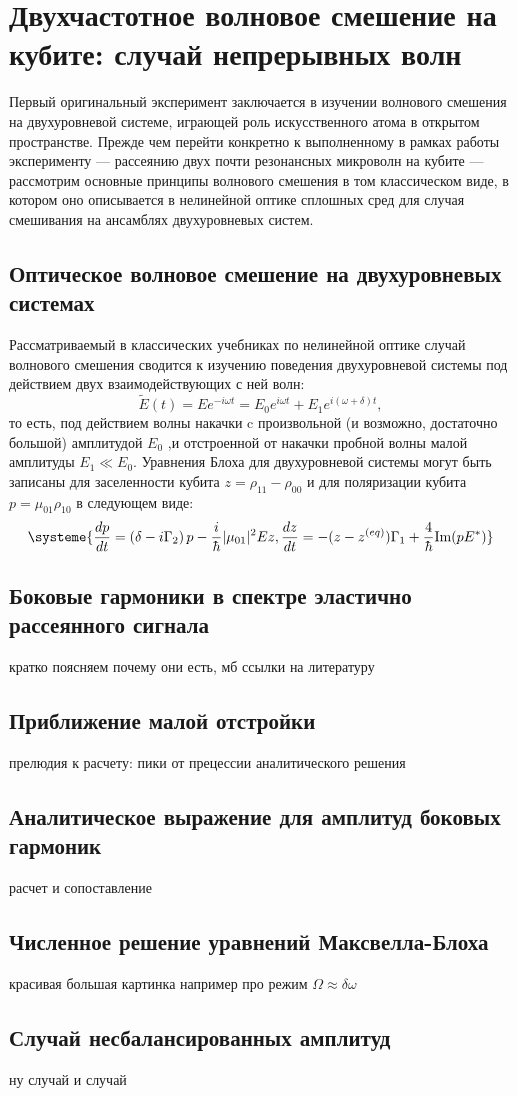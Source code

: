 \chapter{Двухчастотное волновое смешение на кубите: случай непрерывных волн}
Первый оригинальный эксперимент заключается в изучении волнового смешения на двухуровневой системе, играющей роль искусственного атома в открытом пространстве. Прежде чем перейти конкретно к выполненному в рамках работы эксперименту --- рассеянию двух почти резонансных микроволн на кубите --- рассмотрим основные принципы волнового смешения в том классическом виде, в котором оно описывается в нелинейной оптике сплошных сред для случая смешивания на ансамблях двухуровневых систем.
\section{Оптическое волновое смешение на двухуровневых системах}
Рассматриваемый в классических учебниках по нелинейной оптике случай волнового смешения сводится к изучению поведения двухуровневой системы под действием двух взаимодействующих с ней волн:
\begin{equation}
\tilde{E}(t) = Ee^{-i\omega t} = E_0e^{i\omega t} + E_1e^{i(\omega+\delta) t},
\end{equation}
то есть, под действием волны накачки c произвольной (и возможно, достаточно большой) амплитудой $E_0$ ,и отстроенной от накачки пробной волны малой амплитуды $E_1 \ll E_0$. Уравнения Блоха для двухуровневой системы могут быть записаны для заселенности кубита $z = \rho_{11}-\rho_{00}$ и для поляризации кубита $p=\mu_{01}\rho_{10}$ в следующем виде:
\begin{equation}
\systeme{\frac{dp}{dt} = \left(\delta-i\Gamma_2\right)p -\frac{i}{\hbar}|\mu_{01}|^2Ez,
	 \frac{dz}{dt} = -(z-z^{(eq)})\Gamma_1 + \frac{4}{\hbar}\text{Im}(pE^*)}
\end{equation}

\section{Боковые гармоники в спектре эластично рассеянного сигнала}
кратко поясняем почему они есть, мб ссылки на литературу
\section{Приближение малой отстройки}
прелюдия к расчету: пики от прецессии аналитического решения
\section{Аналитическое выражение для амплитуд боковых гармоник}
расчет и сопоставление
\section{Численное решение уравнений Максвелла-Блоха}
красивая большая картинка например про режим $\Omega \approx \delta \omega$
\section{Случай несбалансированных амплитуд}
 ну случай и случай